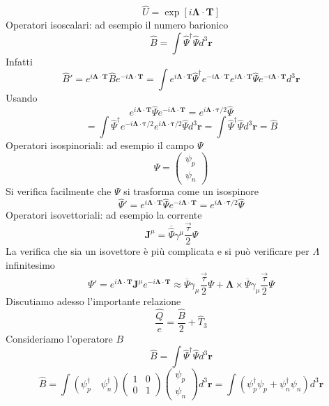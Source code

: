 $$
\widehat{U} = \exp[i \boldsymbol{\Lambda} \cdot \mathbf{T}]
$$
Operatori isoscalari: ad esempio il numero barionico
$$
\widehat{B} = \int \widehat{\Psi}^\dagger \widehat{\Psi} d^3\mathbf{r}
$$
Infatti
$$
\widehat{B}' = e^{i\boldsymbol{\Lambda} \cdot \mathbf{T}} \widehat{B} e^{-i\boldsymbol{\Lambda} \cdot \mathbf{T}} = \int e^{i\boldsymbol{\Lambda} \cdot \mathbf{T}} \widehat{\Psi}^\dagger e^{-i\boldsymbol{\Lambda} \cdot \mathbf{T}} e^{i\boldsymbol{\Lambda} \cdot \mathbf{T}} \widehat{\Psi} e^{-i\boldsymbol{\Lambda} \cdot \mathbf{T}} d^3\mathbf{r}
$$
Usando
$$
e^{i\boldsymbol{\Lambda} \cdot \mathbf{T}} \widehat{\Psi} e^{-i\boldsymbol{\Lambda} \cdot \mathbf{T}} = e^{i\boldsymbol{\Lambda} \cdot \boldsymbol{\tau}/2} \widehat{\Psi}
$$
$$
= \int \widehat{\Psi}^\dagger e^{-i\boldsymbol{\Lambda} \cdot \boldsymbol{\tau}/2} e^{i\boldsymbol{\Lambda} \cdot \boldsymbol{\tau}/2} \widehat{\Psi} d^3\mathbf{r} = \int \widehat{\Psi}^\dagger \widehat{\Psi} d^3\mathbf{r} = \widehat{B}
$$
Operatori isospinoriali: ad esempio il campo $\Psi$
$$
\Psi = \begin{pmatrix} \psi_p \\ \psi_n \end{pmatrix}
$$
Si verifica facilmente che $\Psi$ si trasforma come un isospinore
$$
\widehat{\Psi}' = e^{i\boldsymbol{\Lambda} \cdot \mathbf{T}} \widehat{\Psi} e^{-i\boldsymbol{\Lambda} \cdot \mathbf{T}} = e^{i\boldsymbol{\Lambda} \cdot \boldsymbol{\tau}/2} \widehat{\Psi}  
$$
Operatori isovettoriali: ad esempio la corrente
$$
\mathbf{J}^\mu = \overline{\widehat{\Psi}} \gamma^\mu \frac{\vec{\tau}}{2} \widehat{\Psi} \qquad 
$$
La verifica che sia un isovettore è più complicata e si può verificare per $\Lambda$ infinitesimo
$$
\Psi' = e^{i\boldsymbol{\Lambda} \cdot \mathbf{T}} \mathbf{J}^\mu e^{-i\boldsymbol{\Lambda} \cdot \mathbf{T}} \approx \overline{\Psi} \gamma_\mu \frac{\vec{\tau}}{2} \Psi + \boldsymbol{\Lambda} \times \overline{\Psi} \gamma_\mu \frac{\vec{\tau}}{2} \Psi
$$
Discutiamo adesso l'importante relazione
$$
\frac{\widehat{Q}}{e} = \frac{\widehat{B}}{2} + \widehat{T}_3
$$
Consideriamo l'operatore $B$
$$
\widehat{B} = \int \widehat{\Psi}^\dagger \widehat{\Psi} d^3\mathbf{r}
$$
$$
\widehat{B} = \int (\psi_p^\dagger \quad \psi_n^\dagger) \begin{pmatrix} 1 & 0 \\ 0 & 1 \end{pmatrix} \begin{pmatrix} \psi_p \\ \psi_n \end{pmatrix} d^3\mathbf{r} = \int (\psi_p^\dagger \psi_p + \psi_n^\dagger \psi_n) d^3\mathbf{r}
$$
